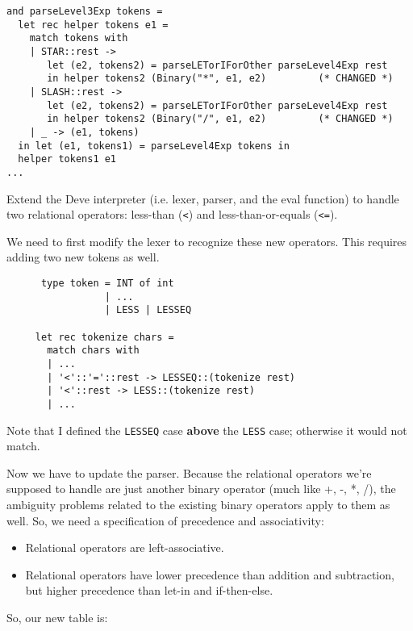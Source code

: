 \documentclass[addpoints]{exam}
\begin{document}
\begin{questions}
\begin{solution}
{\begin{verbatim}
and parseLevel3Exp tokens =
  let rec helper tokens e1 =
    match tokens with
    | STAR::rest ->
       let (e2, tokens2) = parseLETorIForOther parseLevel4Exp rest
       in helper tokens2 (Binary("*", e1, e2)         (* CHANGED *)
    | SLASH::rest ->
       let (e2, tokens2) = parseLETorIForOther parseLevel4Exp rest
       in helper tokens2 (Binary("/", e1, e2)         (* CHANGED *)
    | _ -> (e1, tokens)
  in let (e1, tokens1) = parseLevel4Exp tokens in
  helper tokens1 e1
...
    \end{verbatim}
    }
  \end{solution}
  
  \question
  Extend the Deve interpreter (i.e. lexer, parser, and the
  eval function) to handle two relational operators:
  less-than (\texttt{<}) and less-than-or-equals
  (\texttt{<=}).

  \begin{solution}
    We need to first modify the lexer to recognize
    these new operators. This requires adding
    two new tokens as well.
    
    \begin{verbatim}
      type token = INT of int
                 | ...
                 | LESS | LESSEQ

     let rec tokenize chars =
       match chars with
       | ...
       | '<'::'='::rest -> LESSEQ::(tokenize rest)
       | '<'::rest -> LESS::(tokenize rest)
       | ...
    \end{verbatim}

    Note that I defined the \texttt{LESSEQ} case
    \textbf{above} the \texttt{LESS} case;
    otherwise it would not match.
    
    Now we have to update the parser. Because the relational operators we're supposed to
    handle are just another binary operator (much like +, -, *, /),
    the ambiguity problems related to the existing binary operators apply to them as well.
    So, we need a specification of precedence and associativity:

    \begin{itemize}
    \item Relational operators are left-associative.
    \item Relational operators have lower precedence than addition and subtraction,
      but higher precedence than let-in and if-then-else.
    \end{itemize}

    So, our new table is:


\end{solution}
\end{questions}
\end{document}
